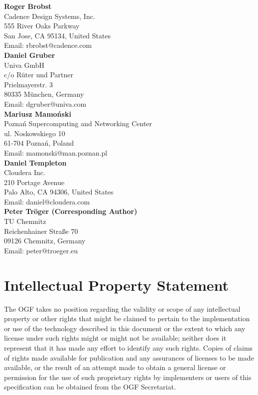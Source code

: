 \documentclass{article}
\begin{document}
\begin{samepage}
\textbf{Roger Brobst}\\
Cadence Design Systems, Inc.\\
555 River Oaks Parkway \\
San Jose, CA 95134, United States\\
Email: rbrobst@cadence.com\\

\textbf{Daniel Gruber}\\
Univa GmbH\\
c/o Rüter und Partner\\
Prielmayerstr. 3\\
80335 München, Germany\\
Email: dgruber@univa.com\\

\textbf{Mariusz Mamoński}\\
Poznań Supercomputing and Networking Center\\
ul. Noskowskiego 10\\
61-704 Poznań, Poland\\
Email: mamonski@man.poznan.pl\\

\textbf{Daniel Templeton} \\
Cloudera Inc.\\
210 Portage Avenue\\
Palo Alto, CA 94306, United States\\
Email: daniel@cloudera.com\\

\textbf{Peter Tröger (Corresponding Author)} \\
TU Chemnitz\\
Reichenhainer Straße 70\\
09126 Chemnitz, Germany\\
Email: peter@troeger.eu \\
\end{samepage}



\section{Intellectual Property Statement}

 The OGF takes no position regarding the validity or scope of any
 intellectual property or other rights that might be claimed to
 pertain to the implementation or use of the technology described in
 this document or the extent to which any license under such rights
 might or might not be available; neither does it represent that it
 has made any effort to identify any such rights.  Copies of claims of
 rights made available for publication and any assurances of licenses
 to be made available, or the result of an attempt made to obtain a
 general license or permission for the use of such proprietary rights
 by implementers or users of this specification can be obtained from
 the OGF Secretariat.
\end{document}
